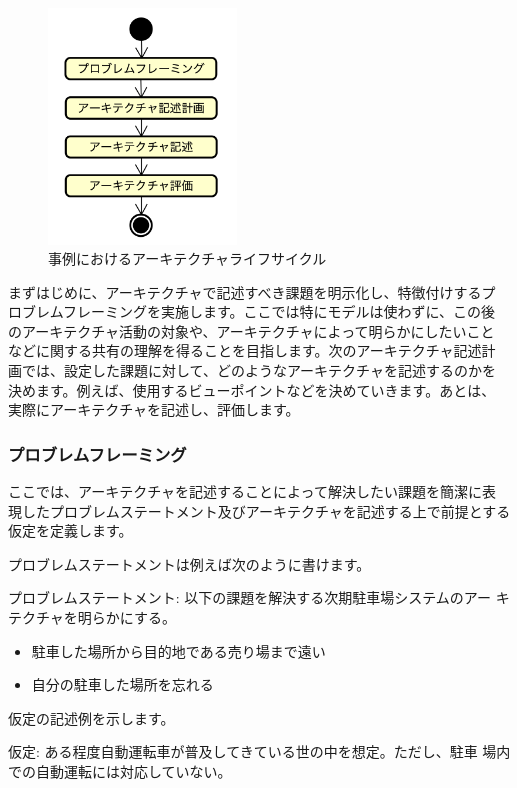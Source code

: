 \begin{figure}
    \begin{center}
    \includegraphics[width=50mm]{safety_assurance_contents/ch4images/fig8.png}
    \caption{事例におけるアーキテクチャライフサイクル}
    \label{figure:ch4-6}
    \end{center}
\end{figure}
まずはじめに、アーキテクチャで記述すべき課題を明示化し、特徴付けするプ
ロブレムフレーミングを実施します。ここでは特にモデルは使わずに、この後
のアーキテクチャ活動の対象や、アーキテクチャによって明らかにしたいこと
などに関する共有の理解を得ることを目指します。次のアーキテクチャ記述計
画では、設定した課題に対して、どのようなアーキテクチャを記述するのかを
決めます。例えば、使用するビューポイントなどを決めていきます。あとは、
実際にアーキテクチャを記述し、評価します。
\subsubsection{プロブレムフレーミング}
ここでは、アーキテクチャを記述することによって解決したい課題を簡潔に表
現したプロブレムステートメント及びアーキテクチャを記述する上で前提とする
仮定を定義します。

プロブレムステートメントは例えば次のように書けます。

\begin{screen}
プロブレムステートメント: 以下の課題を解決する次期駐車場システムのアー
キテクチャを明らかにする。
\begin{itemize}
\item
  駐車した場所から目的地である売り場まで遠い
\item
  自分の駐車した場所を忘れる
\end{itemize}
\end{screen}

仮定の記述例を示します。
\begin{screen}
  仮定: ある程度自動運転車が普及してきている世の中を想定。ただし、駐車
  場内での自動運転には対応していない。
\end{screen}
